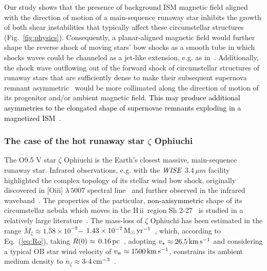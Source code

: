 \documentclass[useAMS,usenatbib]{mn2e}
\newcommand\hii{H\,{\sc ii} \,}
\begin{document}
Our study shows that the presence of background ISM magnetic field aligned with
the direction of motion of a main-sequence runaway star inhibits the growth of
both shear instabilities that typically affect these
circumstellar structures (Fig.~\ref{fig:physics}).
Consequently, a planar-aligned magnetic field would further shape the reverse
shock of moving stars' bow shocks as a smooth tube in which shocks waves could
be channeled as a jet-like extension, e.g. as in~\citet{cox_mnras_250_1991}.
Additionally, the shock wave outflowing out of the forward shock of circumstellar 
structures of runaway stars that are sufficiently dense to make their
subsequent supernova remnant asymmetric~\citep{meyer_mnras_450_2015} would be
more collimated along the direction of motion of its progenitor and/or ambient magnetic
field. \textcolor{black}{This may produce additional asymmetries to the elongated shape 
of supernovae remnants exploding in a magnetized ISM~\citep{rozyczka_274_MNRAS_1995}.} 


\subsubsection{The case of the hot runaway star $\zeta$ Ophiuchi}
\label{sect:obs}


The O9.5 V star $\zeta$ Ophiuchi is the Earth's closest massive, main-sequence 
runaway star. Infrared observations, e.g. with the ${\it WISE}$ $3.4\, \mu m$ 
facility~\citep[band W1, ][see Fig.~\ref{fig:obs}\footnote{http://wise2.ipac.caltech.edu/docs/release/allsky/}]{wright_aj_140_2010} highlighted the complex topology of its stellar wind bow 
shock, originally discovered in [O{\sc iii}] $\lambda \, 5007$ spectral 
line~\citep{gull_apj_230_1979} and further observed in the infrared 
waveband~\citep{vanburen_apj_329_1988}. The properties of the particular, 
\textcolor{black}{non-axisymmetric} shape of its circumstellar nebula which moves 
in the \hii region Sh 2-27~\citep{sharpless_apj_1959} is studied in a relatively 
large literature~\citep[see][and references therein]{mackey_mnras_2013}. The 
mass-loss of $\zeta$ Ophiuchi has been estimated in the range $\dot{M}_{\zeta} 
\approx 1.58 \times 10^{-9}$$-$ $1.43 \times 10^{-7}\, \rm M_{\odot}\, \rm 
yr^{-1}$~\citep{gvaramadze_mnras_427_2012}, which, according to 
Eq.~(\ref{eq:Ro}), taking $R(0)\approx\, 0.16\, \rm 
pc$~\citep{gvaramadze_mnras_427_2012}, adopting $v_{\star} \approx 26.5\, \rm 
km\, \rm s^{-1}$ and considering a typical OB star wind velocity of $v_{\rm 
w}\approx1500\, \rm km\, \rm s^{-1}$, constrains its ambient medium density to 
$n_{\zeta}\approx 3$-$4\, \rm cm^{-3}$~\citep[cf.][]{gull_apj_230_1979}. 
\end{document}

